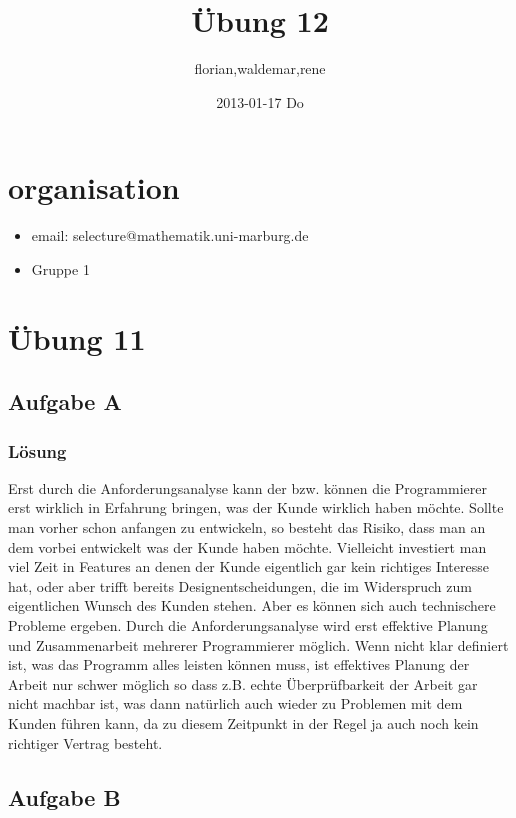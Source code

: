 \documentclass[11pt]{article}
\title{Übung 12}
\author{florian,waldemar,rene}
\date{2013-01-17 Do}
\begin{document}
\maketitle

\setcounter{tocdepth}{3}
\tableofcontents
\vspace*{1cm}
\section{organisation}
\label{sec-1}

\begin{itemize}
\item email: selecture@mathematik.uni-marburg.de
\item Gruppe 1
\end{itemize}
\section{Übung 11}
\label{sec-2}
\subsection{Aufgabe A}
\label{sec-2-1}
\subsubsection{Lösung}
\label{sec-2-1-1}

Erst durch die Anforderungsanalyse kann der bzw. können die Programmierer erst wirklich
in Erfahrung bringen, was der Kunde wirklich haben möchte. Sollte man
vorher schon anfangen zu entwickeln, so besteht das Risiko, dass man
an dem vorbei entwickelt was der Kunde haben möchte. Vielleicht
investiert man viel Zeit in Features an denen der Kunde eigentlich gar
kein richtiges Interesse hat, oder aber trifft bereits
Designentscheidungen, die im Widerspruch zum eigentlichen Wunsch des
Kunden stehen.
Aber es können sich auch technischere Probleme ergeben. Durch die
Anforderungsanalyse wird erst effektive Planung und Zusammenarbeit
mehrerer Programmierer möglich. Wenn nicht klar definiert ist, was das
Programm alles leisten können muss, ist effektives Planung der Arbeit
nur schwer möglich so dass z.B. echte Überprüfbarkeit der Arbeit gar
nicht machbar ist, was dann natürlich auch wieder zu Problemen mit dem
Kunden führen kann, da zu diesem Zeitpunkt in der Regel ja auch noch
kein richtiger Vertrag besteht.
\subsection{Aufgabe B}
\label{sec-2-2}
\end{document}

